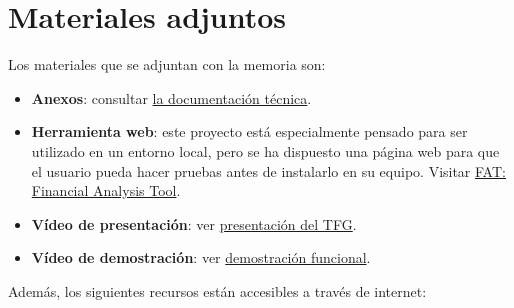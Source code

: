 \section{Materiales adjuntos}\label{materiales-adjuntos}

Los materiales que se adjuntan con la memoria son: 

\begin{itemize}
\item
	\textbf{Anexos}: consultar \href{https://github.com/rmt0009alu/FAT/blob/main/docs/latex/anexos.pdf}{la documentación técnica}.
\item
	\textbf{Herramienta web}: este proyecto está especialmente pensado para ser utilizado en un entorno local, pero se ha dispuesto una página web para que el usuario pueda hacer pruebas antes de instalarlo en su equipo. Visitar \href{http://takeiteasy.pythonanywhere.com/}{FAT: Financial Analysis Tool}.
\item	
	\textbf{Vídeo de presentación}: ver \href{https://universidaddeburgos-my.sharepoint.com/:v:/g/personal/rmt0009_alu_ubu_es/ESxs2XNp1v1PneyThIJRvqwBMulJvKeV0N6i_M6qe1m9Qw?nav=eyJyZWZlcnJhbEluZm8iOnsicmVmZXJyYWxBcHAiOiJPbmVEcml2ZUZvckJ1c2luZXNzIiwicmVmZXJyYWxBcHBQbGF0Zm9ybSI6IldlYiIsInJlZmVycmFsTW9kZSI6InZpZXciLCJyZWZlcnJhbFZpZXciOiJNeUZpbGVzTGlua0NvcHkifX0&e=seXrau}{presentación del TFG}.
\item	
	\textbf{Vídeo de demostración}: ver \href{https://universidaddeburgos-my.sharepoint.com/:v:/g/personal/rmt0009_alu_ubu_es/ERDnSesZvZdEgb9AV8b61YIBEUTlbkuAhP9xIqAlq5VtAg?nav=eyJyZWZlcnJhbEluZm8iOnsicmVmZXJyYWxBcHAiOiJPbmVEcml2ZUZvckJ1c2luZXNzIiwicmVmZXJyYWxBcHBQbGF0Zm9ybSI6IldlYiIsInJlZmVycmFsTW9kZSI6InZpZXciLCJyZWZlcnJhbFZpZXciOiJNeUZpbGVzTGlua0NvcHkifX0&e=kKGJyF}{demostración funcional}.
\end{itemize}

Además, los siguientes recursos están accesibles a través de internet:


